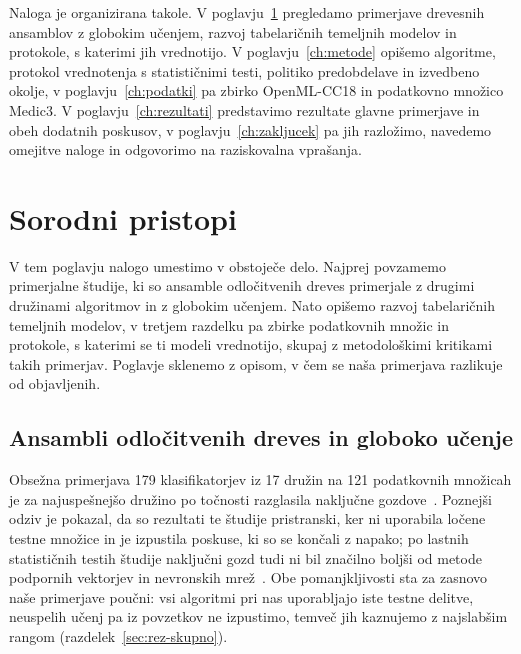 \documentclass[a4paper,12pt,openright]{book}
\begin{document}
Naloga je organizirana takole. V poglavju~\ref{ch:sorodni} pregledamo
primerjave drevesnih ansamblov z globokim učenjem, razvoj tabelaričnih
temeljnih modelov in protokole, s katerimi jih vrednotijo. V
poglavju~\ref{ch:metode} opišemo algoritme, protokol vrednotenja s
statističnimi testi, politiko predobdelave in izvedbeno okolje, v
poglavju~\ref{ch:podatki} pa zbirko OpenML-CC18 in podatkovno množico Medic3. V
poglavju~\ref{ch:rezultati} predstavimo rezultate glavne primerjave in obeh
dodatnih poskusov, v poglavju~\ref{ch:zakljucek} pa jih razložimo, navedemo
omejitve naloge in odgovorimo na raziskovalna vprašanja.

\chapter{Sorodni pristopi}
\label{ch:sorodni}

V tem poglavju nalogo umestimo v obstoječe delo. Najprej povzamemo primerjalne
študije, ki so ansamble odločitvenih dreves primerjale z drugimi družinami
algoritmov in z globokim učenjem.
Nato opišemo razvoj tabelaričnih temeljnih modelov, v tretjem razdelku pa
zbirke podatkovnih množic in protokole, s katerimi se ti modeli vrednotijo,
skupaj z metodološkimi kritikami takih primerjav. Poglavje sklenemo z opisom,
v čem se naša primerjava razlikuje od objavljenih.

\section{Ansambli odločitvenih dreves in globoko učenje}
\label{sec:sor-drevesa}

Obsežna primerjava 179 klasifikatorjev iz 17 družin na 121 podatkovnih
množicah je za najuspešnejšo družino po točnosti
razglasila naključne gozdove~\cite{fernandez2014we}. Poznejši odziv je
pokazal, da so rezultati te študije pristranski, ker ni uporabila ločene
testne množice in je izpustila poskuse, ki so se končali z napako; po lastnih
statističnih testih študije naključni gozd tudi ni bil značilno boljši od
metode podpornih vektorjev in nevronskih mrež~\cite{wainberg2016random}. Obe
pomanjkljivosti sta za zasnovo naše primerjave poučni: vsi algoritmi pri nas
uporabljajo iste testne delitve, neuspelih učenj pa iz povzetkov ne izpustimo,
temveč jih kaznujemo z najslabšim rangom (razdelek~\ref{sec:rez-skupno}).
\end{document}
